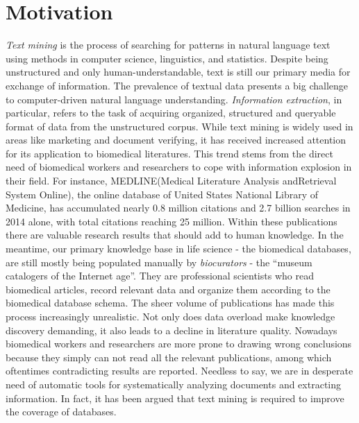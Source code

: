 \section{Motivation}\label{section1.1} %
\emph{Text mining} is the process of searching for patterns in natural language text using methods in computer science, linguistics, and statistics. Despite being unstructured and only human-understandable, text is still our primary media for exchange of information\cite{witten2005text}. The prevalence of textual data presents a big challenge to computer-driven natural language understanding. \emph{Information extraction}, in particular, refers to the task of acquiring organized, structured and queryable format of data from the unstructured corpus. \newline\newline
While text mining is widely used in areas like marketing and document verifying, it has received increased attention for its application to biomedical literatures\cite{kim2003genia,ananiadou2006text,krallinger2005text}. This trend stems from the direct need of biomedical workers and researchers to cope with information explosion in their field. For instance, MEDLINE(Medical Literature Analysis andRetrieval System Online), the online database of United States National Library of Medicine, has accumulated nearly 0.8 million citations and 2.7 billion searches in 2014 alone\cite{MEDLINE:2015:Online}, with total citations reaching 25 million. Within these publications there are valuable research results that should add to human knowledge. In the meantime,  our primary knowledge base in life science - the biomedical databases, are still mostly being populated manually by \emph{biocurators} - the ``museum catalogers of the Internet age''\cite{wiki:biocurators}. They are professional scientists who read biomedical articles, record relevant data and organize them according to the biomedical database schema. The sheer volume of publications has made this process increasingly unrealistic\cite{cohen2005survey}.\newline\newline
Not only does data overload make knowledge discovery demanding, it also leads to a decline in literature quality. Nowadays biomedical workers and researchers are more prone to drawing wrong conclusions because they simply can not read all the relevant publications, among which oftentimes contradicting results are reported. Needless to say, we are in desperate need of automatic tools for systematically analyzing documents and extracting information. In fact, it has been argued that text mining is required to improve the coverage of databases\cite{baumgartner2007manual}.


